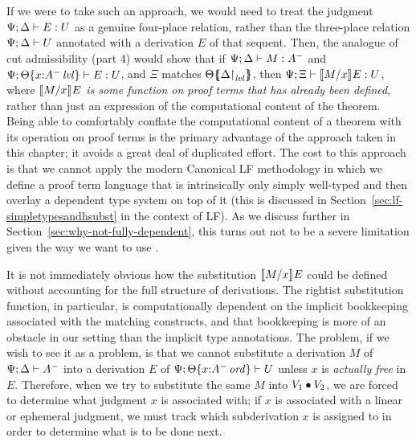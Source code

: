 If we were to take such an approach, we would need to treat the
judgment ${\Psi}; {\Delta} \vdash {E} : {U}$ as a genuine four-place relation,
rather than the three-place relation ${\Psi};{\Delta} \vdash {U} \mathstrut$ annotated
with a derivation $E$ of that sequent.  Then, the analogue of cut
admissibility (part 4) would show that if
${\Psi}; {\Delta} \vdash {M} : {A^-}$ and
${\Psi}; {{\Theta}\{{x{:}{A^-}\,{{\it lvl}}}\}} \vdash {E} : {U}$, and $\Xi$
matches ${\Theta}\mbox{$\{\hspace{-4pt}\{$}{\ensuremath{{\Delta}{\upharpoonright}_{{\it lvl}}}}\mbox{$\}\hspace{-4pt}\}$}$, then
${\Psi}; {\Xi} \vdash {\llbracket {M}/{x} \rrbracket^{} {E}} : {U}$, where {\it $\llbracket {M}/{x} \rrbracket^{} {E}$
  is some function on proof terms that has already been defined},
rather than just an expression of the computational content of the
theorem. Being able to comfortably conflate the computational content
of a theorem with its operation on proof terms is the primary
advantage of the approach taken in this chapter; it avoids a great
deal of duplicated effort. The cost to this approach is that we cannot
apply the modern Canonical LF methodology in which we define a proof
term language that is intrinsically only simply well-typed and then
overlay a dependent type system on top of it (this is discussed in
Section~\ref{sec:lf-simpletypesandhsubst} in the context of LF). As we
discuss further in Section~\ref{sec:why-not-fully-dependent}, this
turns out not to be a severe limitation given the way we want to use
\ollll.

It is not immediately obvious how the substitution 
$\llbracket {M}/{x} \rrbracket^{} {E}$ could be defined without accounting for the 
full structure of derivations. The rightist substitution function,
in particular, is computationally dependent
on the implicit bookkeeping associated with the matching constructs, and
that bookkeeping is  more of an obstacle in our setting than the
implicit type annotations. 
The problem, if we wish to see it as a problem, is that we cannot
substitute a derivation $M$ of ${\Psi};{\Delta} \vdash {A^-} \mathstrut$
into a derivation $E$ of ${\Psi};{{\Theta}\{{x{:}{A^-}\,{{\it ord}}}\}} \vdash {U} \mathstrut$
unless $x$ is {\it actually free} in $E$. Therefore, when we try to
substitute the same $M$ into ${V_1} \mathbin{\bullet} {V_2}$, we are forced to determine
what judgment $x$ is associated with; if $x$ is associated with a
linear or ephemeral judgment, we must track which subderivation 
$x$ is assigned to in order to determine what is to be done next. 

